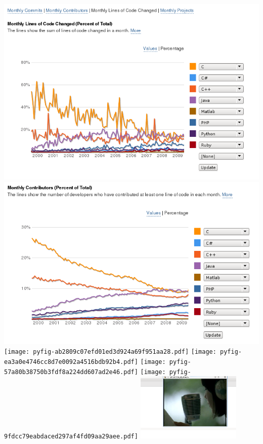 \documentclass{report}
\begin{document}
\includegraphics[width=\textwidth]{pythonohloh3.png}
\clearpage%
\includegraphics[width=\textwidth]{pythonohloh1.png}
\clearpage%
\texttt{[image: pyfig-ab2809c07efd01ed3d924a69f951aa28.pdf]}
\clearpage%
\texttt{[image: pyfig-ea3a0e4746cc8d7e0092a4516bdb92b4.pdf]}
\clearpage%
\texttt{[image: pyfig-57a80b38750b3fdf8a224dd607ad2e46.pdf]}
\clearpage%
\texttt{[image: pyfig-9fdcc79eabdaced297af4fd09aa29aee.pdf]}
\clearpage%
\includegraphics[width=5cm]{playvideoqt.png}
\clearpage%
\end{document}
